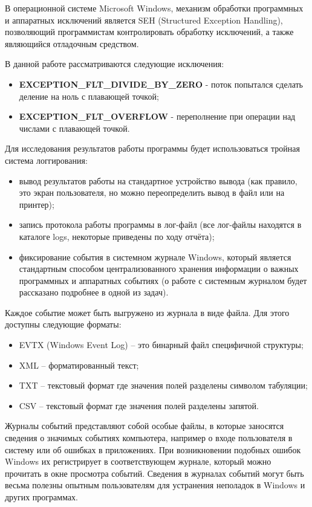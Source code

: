 \documentclass[a4paper, 12pt]{report}		%
\begin{document}
В операционной системе Microsoft Windows, механизм обработки программных и аппаратных исключений является SEH (Structured Exception Handling), позволяющий программистам контролировать обработку исключений, а также являющийся отладочным средством.

\vspace{1em}
В данной работе рассматриваются следующие исключения:
\begin{itemize}
\item \textbf{EXCEPTION\_FLT\_DIVIDE\_BY\_ZERO} - поток попытался сделать деление на ноль с плавающей точкой;
\item \textbf{EXCEPTION\_FLT\_OVERFLOW} - переполнение при операции над числами с плавающей точкой.
\end{itemize}

Для исследования результатов работы программы будет использоваться тройная система логгирования:
\begin{itemize}
\item вывод результатов работы на стандартное устройство вывода (как правило, это экран пользователя, но можно переопределить вывод в файл или на принтер);
\item запись протокола работы программы в лог-файл (все лог-файлы находятся в каталоге logs, некоторые приведены по ходу отчёта);
\item фиксирование события в системном журнале Windows, который является стандартным способом централизованного хранения информации о важных программных и аппаратных событиях (о работе с системным журналом будет рассказано подробнее в одной из задач).
\end{itemize}

Каждое событие может быть выгружено из журнала в виде файла. Для этого доступны следующие форматы:
\begin{itemize}
\item EVTX (Windows Event Log) -- это бинарный файл специфичной структуры;
\item XML -- форматированный текст;
\item TXT -- текстовый формат где значения полей разделены символом табуляции;
\item CSV -- текстовый формат где значения полей разделены запятой.
\end{itemize}

Журналы событий представляют собой особые файлы, в которые заносятся сведения о значимых событиях компьютера, например о входе пользователя в систему или об ошибках в приложениях. При возникновении подобных ошибок Windows их регистрирует в соответствующем журнале, который можно прочитать в окне просмотра событий. Сведения в журналах событий могут быть весьма полезны опытным пользователям для устранения неполадок в Windows и других программах.
\end{document}
